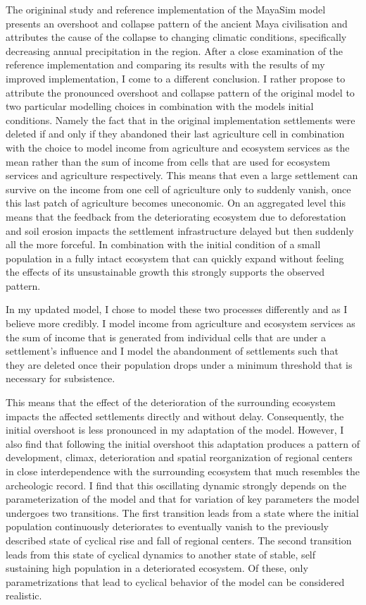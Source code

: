 The origininal study \citep{Heckbert2013} and reference implementation \citep{Heckbert2013model} of the MayaSim model presents an overshoot and collapse pattern of the ancient Maya civilisation and attributes the cause of the collapse to changing climatic conditions, specifically decreasing annual precipitation in the region. After a close examination of the reference implementation and comparing its results with the results of my improved implementation, I come to a different conclusion. I rather propose to attribute the pronounced overshoot and collapse pattern of the original model to two particular modelling choices in combination with the models initial conditions. Namely the fact that in the original implementation settlements were deleted if and only if they abandoned their last agriculture cell in combination with the choice to model income from agriculture and ecosystem services as the mean rather than the sum of income from cells that are used for ecosystem services and agriculture respectively. This means that even a large settlement can survive on the income from one cell of agriculture only to suddenly vanish, once this last patch of agriculture becomes uneconomic. On an aggregated level this means that the feedback from the deteriorating ecosystem due to deforestation and soil erosion impacts the settlement infrastructure delayed but then suddenly all the more forceful. In combination with the initial condition of a small population in a fully intact ecosystem that can quickly expand without feeling the effects of its unsustainable growth this strongly supports the observed pattern.

In my updated model, I chose to model these two processes differently and as I believe more credibly. I model income from agriculture and ecosystem services as the sum of income that is generated from individual cells that are under a settlement's influence and I model the abandonment of settlements such that they are deleted once their population drops under a minimum threshold that is necessary for subsistence.

This means that the effect of the deterioration of the surrounding ecosystem impacts the affected settlements directly and without delay. Consequently, the initial overshoot is less pronounced in my adaptation of the model. However, I also find that following the initial overshoot this adaptation produces a pattern of development, climax, deterioration and spatial reorganization of regional centers in close interdependence with the surrounding ecosystem that much resembles the archeologic record. I find that this oscillating dynamic strongly depends on the parameterization of the model and that for variation of key parameters the model undergoes two transitions. The first transition leads from a state where the initial population continuously deteriorates to eventually vanish to the previously described state of cyclical rise and fall of regional centers. The second transition leads from this state of cyclical dynamics to another state of stable, self sustaining high population in a deteriorated ecosystem. Of these, only parametrizations that lead to cyclical behavior of the model can be considered realistic.

